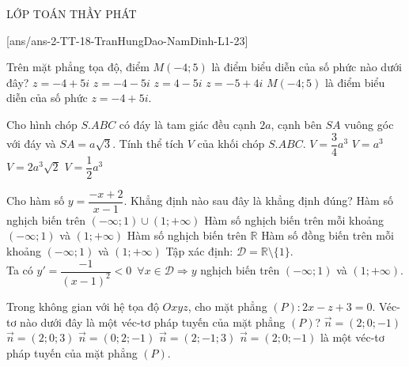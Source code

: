 \begin{name}
	{\tenchude}{\tendethi}{LỚP TOÁN THẦY PHÁT}{\thoigian}
\end{name}
\setcounter{ex}{0}\setcounter{bt}{0}
[ans/ans-2-TT-18-TranHungDao-NamDinh-L1-23]
\begin{ex}%
Trên mặt phẳng tọa độ, điểm $M(-4;5)$ là điểm biểu diễn của số phức nào dưới đây?
\choice 
{\True $z=-4+5i$} 
{$z=-4-5i$}
{$z=4-5i$} 
{$z=-5+4i$}
\loigiai
{
$M(-4;5)$ là điểm biểu diễn của số phức $z=-4+5i$.
}
\end{ex}

\begin{ex}%
Cho hình chóp $S.ABC$ có đáy là tam giác đều cạnh $2a$, cạnh bên $SA$ vuông góc với đáy và $SA=a\sqrt{3}$. Tính thể tích $V$ của khối chóp $S.ABC$.
\choice 
{$V=\dfrac{3}{4}a^3$} 
{\True $V=a^3$}
{$V=2a^3\sqrt{2}$} 
{$V=\dfrac{1}{2}a^3$}
\loigiai
{
}
\end{ex}

\begin{ex}%
Cho hàm số $y=\dfrac{-x+2}{x-1}$. Khẳng định nào sau đây là khẳng định đúng?
\choice 
{Hàm số nghịch biến trên $(-\infty ;1)\cup (1;+\infty )$} 
{\True Hàm số nghịch biến trên mỗi khoảng $(-\infty ;1)$ và $(1;+\infty )$}
{Hàm số nghịch biến trên $\mathbb{R}$} 
{Hàm số đồng biến trên mỗi khoảng $(-\infty ;1)$ và $(1;+\infty )$}
\loigiai
{
Tập xác định: $\mathscr D=\mathbb{R}\setminus\{1\}$.\\
Ta có $y'=\dfrac{-1}{(x-1)^2}<0\,\,\,\forall x\in\mathscr D\Rightarrow y$ nghịch biến trên $(-\infty ;1)$ và $(1;+\infty )$.
}
\end{ex}

\begin{ex}%
Trong không gian với hệ tọa độ $Oxyz$, cho mặt phẳng $(P)\colon 2x-z+3=0$. Véc-tơ nào dưới đây là một véc-tơ pháp tuyến của mặt phẳng $(P)$?
\choice 
{\True $\overrightarrow{n}=(2;0;-1)$} 
{$\overrightarrow{n}=(2;0;3)$}
{$\overrightarrow{n}=(0;2;-1)$} 
{$\overrightarrow{n}=(2;-1;3)$}
\loigiai
{
$\overrightarrow{n}=(2;0;-1)$ là một véc-tơ pháp tuyến của mặt phẳng $(P)$.
}
\end{ex}

